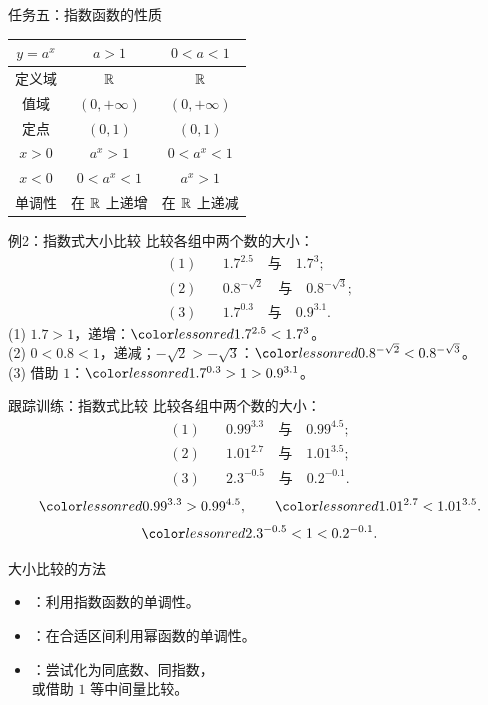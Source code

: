 \documentclass[aspectratio=169,10pt]{beamer}
\begin{document}
\begin{frame}[t]{任务五：指数函数的性质}
 \centering\normalsize\renewcommand{\arraystretch}{1.65}
 \begin{tabular}{c|c|c}
  \toprule $y=a^x$ & $a>1$ & $0<a<1$\\\midrule
  定义域 & $\mathbb R$ & $\mathbb R$\\
  值域 & $(0,+\infty)$ & $(0,+\infty)$\\
  定点 & $(0,1)$ & $(0,1)$\\
  $x>0$ & $a^x>1$ & $0<a^x<1$\\
  $x<0$ & $0<a^x<1$ & $a^x>1$\\
  单调性 & 在 $\mathbb R$ 上递增 & 在 $\mathbb R$ 上递减\\\bottomrule
 \end{tabular}
 \gap
\end{frame}

\begin{frame}[t]{例2：指数式大小比较}
 比较各组中两个数的大小：
 \begin{align*}
  (1)&\quad 1.7^{2.5}\quad\text{与}\quad1.7^3;\\[.5em]
  (2)&\quad 0.8^{-\sqrt2}\quad\text{与}\quad0.8^{-\sqrt3};\\[.5em]
  (3)&\quad 1.7^{0.3}\quad\text{与}\quad0.9^{3.1}.
 \end{align*}
 \pause
 \normalsize
 (1) $1.7>1$，递增：$\ans{1.7^{2.5}<1.7^3}$。\\[.3em]
 (2) $0<0.8<1$，递减；$-\sqrt2>-\sqrt3$：$\ans{0.8^{-\sqrt2}<0.8^{-\sqrt3}}$。\\[.3em]
 (3) 借助 $1$：$\ans{1.7^{0.3}>1>0.9^{3.1}}$。
\end{frame}

\begin{frame}[t]{跟踪训练：指数式比较}
 比较各组中两个数的大小：
 \begin{align*}
  (1)&\quad 0.99^{3.3}\quad\text{与}\quad0.99^{4.5};\\[.5em]
  (2)&\quad 1.01^{2.7}\quad\text{与}\quad1.01^{3.5};\\[.5em]
  (3)&\quad 2.3^{-0.5}\quad\text{与}\quad0.2^{-0.1}.
 \end{align*}
 \pause
 \[\ans{0.99^{3.3}>0.99^{4.5}},\qquad
   \ans{1.01^{2.7}<1.01^{3.5}}.\]
 \[\ans{2.3^{-0.5}<1<0.2^{-0.1}}.\]
\end{frame}

\begin{frame}[t]{大小比较的方法}
 \begin{itemize}
  \item {}：利用指数函数的单调性。
  \item {}：在合适区间利用幂函数的单调性。
  \item {}：尝试化为同底数、同指数，\\
        或借助 $1$ 等中间量比较。
 \end{itemize}
 \gap
\end{frame}
\end{document}
